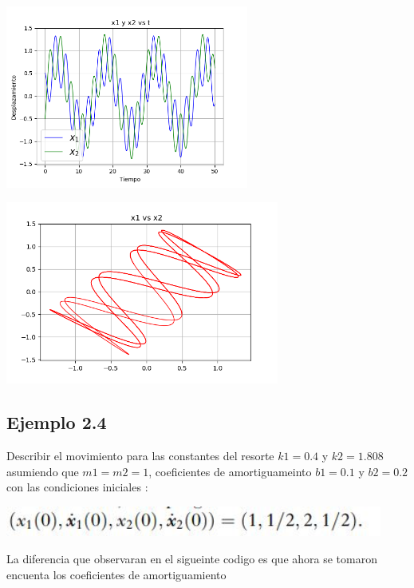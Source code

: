 \documentclass{article}
\begin{document}
\begin{center}
\includegraphics[height=6cm]{resortes2_3_5.png}
\end{center}

\begin{center}
\includegraphics[height=6cm]{resortes2_3_6.png}
\end{center}

\subsection{Ejemplo 2.4}

Describir el movimiento para las constantes del resorte $k1=0.4$ y $k2=1.808$ asumiendo que $m1=m2=1$, coeficientes de amortiguameinto $b1=0.1$ y $b2=0.2$ con las condiciones iniciales :

\begin{center}
\includegraphics[height=1cm]{ec13.png}
\end{center}

La diferencia que observaran en el sigueinte codigo es que ahora se tomaron encuenta los coeficientes de amortiguamiento
\end{document}
